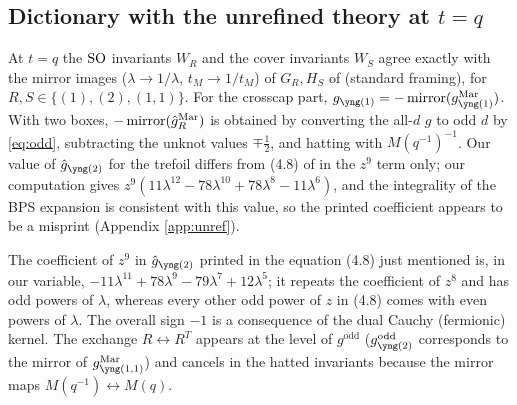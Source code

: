 \subsection{Dictionary with the unrefined theory at \texorpdfstring{$t = q$}{t = q}}
\begin{result}\label{cr:marino}
At $t = q$ the $\mathrm{SO}$ invariants $W_R$ and the cover invariants $W_S$ agree exactly with the mirror images ($\lambda \to 1/\lambda$, $t_M \to 1/t_M$) of $G_R, H_S$ of \cite{Marino09} (standard framing), for $R, S \in \{(1), (2), (1,1)\}$. For the crosscap part, $g_{\yone} = -\mirror(g^{\mathrm{Mar}}_{\yone})$. With two boxes, $-\operatorname{mirror}(\hat g^{\mathrm{Mar}}_R)$ is obtained by converting the all-$d$ $g$ to odd $d$ by \eqref{eq:odd}, subtracting the unknot values $\mp\tfrac12$, and hatting with $M(q^{-1})^{-1}$. Our value of $\hat g_{\ytwo}$ for the trefoil differs from (4.8) of \cite{Marino09} in the $z^9$ term only; our computation gives $z^9(11\lambda^{12} - 78\lambda^{10} + 78\lambda^8 - 11\lambda^6)$, and the integrality of the BPS expansion is consistent with this value, so the printed coefficient appears to be a misprint (Appendix \ref{app:unref}).
\end{result}
The coefficient of $z^9$ in $\hat g_{\ytwo}$ printed in the equation (4.8) just mentioned is, in our variable, $-11\lambda^{11} + 78\lambda^9 - 79\lambda^7 + 12\lambda^5$; it repeats the coefficient of $z^8$ and has odd powers of $\lambda$, whereas every other odd power of $z$ in (4.8) comes with even powers of $\lambda$.
The overall sign $-1$ is a consequence of the dual Cauchy (fermionic) kernel. The exchange $R \leftrightarrow R^T$ appears at the level of $g^{\mathrm{odd}}$ ($g^{\mathrm{odd}}_{\ytwo}$ corresponds to the mirror of $g^{\mathrm{Mar}}_{\yoneone}$) and cancels in the hatted invariants because the mirror maps $M(q^{-1}) \leftrightarrow M(q)$.

